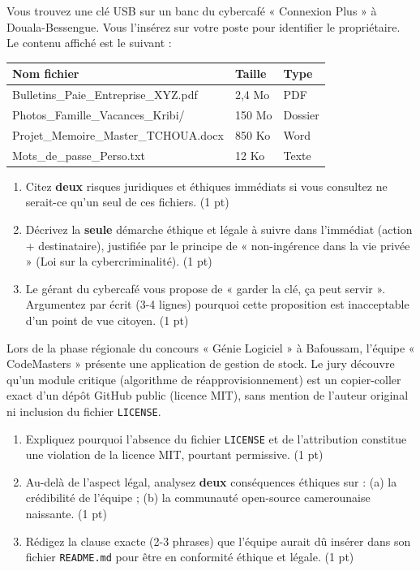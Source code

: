 \documentclass[11pt]{article}
\begin{document}
\begin{exercice}
Vous trouvez une clé USB sur un banc du cybercafé « Connexion Plus » à Douala-Bessengue. Vous l'insérez sur votre poste pour identifier le propriétaire. Le contenu affiché est le suivant :
\begin{center}
\begin{tabular}{|l|l|l|}
\hline
\textbf{Nom fichier} & \textbf{Taille} & \textbf{Type} \\
\hline
Bulletins\_Paie\_Entreprise\_XYZ.pdf & 2,4 Mo & PDF \\
Photos\_Famille\_Vacances\_Kribi/ & 150 Mo & Dossier \\
Projet\_Memoire\_Master\_TCHOUA.docx & 850 Ko & Word \\
Mots\_de\_passe\_Perso.txt & 12 Ko & Texte \\
\hline
\end{tabular}
\end{center}
\begin{enumerate}
    \item Citez \textbf{deux} risques juridiques et éthiques immédiats si vous consultez ne serait-ce qu'un seul de ces fichiers. (1 pt)
    \item Décrivez la \textbf{seule} démarche éthique et légale à suivre dans l'immédiat (action + destinataire), justifiée par le principe de « non-ingérence dans la vie privée » (Loi sur la cybercriminalité). (1 pt)
    \item Le gérant du cybercafé vous propose de « garder la clé, ça peut servir ». Argumentez par écrit (3-4 lignes) pourquoi cette proposition est inacceptable d'un point de vue citoyen. (1 pt)
\end{enumerate}
\end{exercice}

\begin{exercice}
Lors de la phase régionale du concours « Génie Logiciel » à Bafoussam, l'équipe « CodeMasters » présente une application de gestion de stock. Le jury découvre qu'un module critique (algorithme de réapprovisionnement) est un copier-coller exact d'un dépôt GitHub public (licence MIT), sans mention de l'auteur original ni inclusion du fichier \texttt{LICENSE}.
\begin{enumerate}
    \item Expliquez pourquoi l'absence du fichier \texttt{LICENSE} et de l'attribution constitue une violation de la licence MIT, pourtant permissive. (1 pt)
    \item Au-delà de l'aspect légal, analysez \textbf{deux} conséquences éthiques sur : (a) la crédibilité de l'équipe ; (b) la communauté open-source camerounaise naissante. (1 pt)
    \item Rédigez la clause exacte (2-3 phrases) que l'équipe aurait dû insérer dans son fichier \texttt{README.md} pour être en conformité éthique et légale. (1 pt)
\end{enumerate}
\end{exercice}
\end{document}
